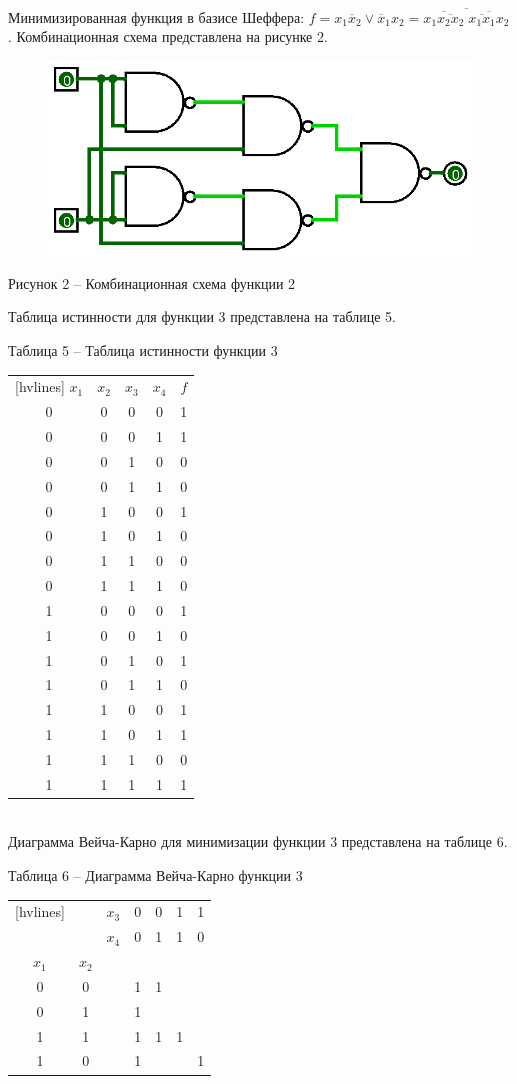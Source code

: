 \documentclass[a4paper,14pt]{extarticle}
\begin{document}
	Минимизированная функция в базисе Шеффера: $f=x_1\overline{x}_2\lor\overline{x}_1x_2=\overline{
		\overline{x_1\overline{x_2x_2}}\;
		\overline{\overline{x_1x_1}x_2}
	}$. Комбинационная схема представлена на рисунке 2.
	
	\begin{figure}[h]
		\centering
		\includegraphics[width=0.5\linewidth]{images/s-1-2}
	\end{figure}
	\begin{center}
		Рисунок 2 – Комбинационная схема функции 2
	\end{center}
	
	\pagebreak
	Таблица истинности для функции 3 представлена на таблице 5.
	
	\noindent Таблица 5 -- Таблица истинности функции 3 \\
	\begin{NiceTabular}{ccccc}[hvlines]
		$x_1$ & $x_2$ & $x_3$ & $x_4$ & $f$ \\
		0 & 0 & 0 & 0 & 1 \\
		0 & 0 & 0 & 1 & 1 \\
		0 & 0 & 1 & 0 & 0 \\
		0 & 0 & 1 & 1 & 0 \\
		0 & 1 & 0 & 0 & 1 \\
		0 & 1 & 0 & 1 & 0 \\
		0 & 1 & 1 & 0 & 0 \\
		0 & 1 & 1 & 1 & 0 \\
		1 & 0 & 0 & 0 & 1 \\
		1 & 0 & 0 & 1 & 0 \\
		1 & 0 & 1 & 0 & 1 \\
		1 & 0 & 1 & 1 & 0 \\
		1 & 1 & 0 & 0 & 1 \\
		1 & 1 & 0 & 1 & 1 \\
		1 & 1 & 1 & 0 & 0 \\
		1 & 1 & 1 & 1 & 1
	\end{NiceTabular}\\
	
	Диаграмма Вейча-Карно для минимизации функции 3 представлена на таблице 6.
	
	\noindent Таблица 6 -- Диаграмма Вейча-Карно функции 3 \\
	\begin{NiceTabular}{ccccccc}[hvlines]
		& & $x_3$ & 0 & 0 & 1 & 1 \\
		& & $x_4$ & 0 & 1 & 1 & 0 \\
		$x_1$ & $x_2$ & & & & & \\
		0 & 0 & & 1 & 1 & & \\
		0 & 1 & & 1 & & & \\
		1 & 1 & & 1 & 1 & 1 & \\
		1 & 0 & & 1 & & & 1 \\
	\end{NiceTabular} \\
	
\end{document}
